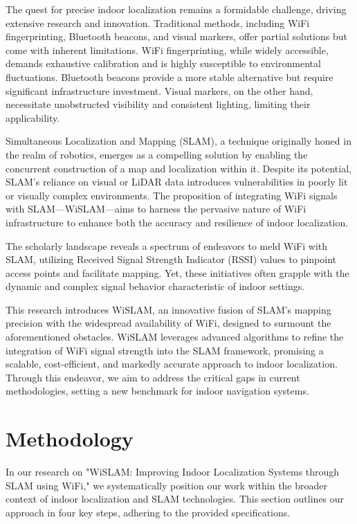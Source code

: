 \documentclass[
	a4paper, %
	11pt, %
	unnumberedsections, %
	twoside, %
]{LTJournalArticle}
\begin{document}
The quest for precise indoor localization remains a formidable challenge, driving extensive research and innovation. Traditional methods, including WiFi fingerprinting, Bluetooth beacons, and visual markers, offer partial solutions but come with inherent limitations. WiFi fingerprinting, while widely accessible, demands exhaustive calibration and is highly susceptible to environmental fluctuations. Bluetooth beacons provide a more stable alternative but require significant infrastructure investment. Visual markers, on the other hand, necessitate unobstructed visibility and consistent lighting, limiting their applicability.

Simultaneous Localization and Mapping (SLAM), a technique originally honed in the realm of robotics, emerges as a compelling solution by enabling the concurrent construction of a map and localization within it. Despite its potential, SLAM's reliance on visual or LiDAR data introduces vulnerabilities in poorly lit or visually complex environments. The proposition of integrating WiFi signals with SLAM—WiSLAM—aims to harness the pervasive nature of WiFi infrastructure to enhance both the accuracy and resilience of indoor localization.

The scholarly landscape reveals a spectrum of endeavors to meld WiFi with SLAM, utilizing Received Signal Strength Indicator (RSSI) values to pinpoint access points and facilitate mapping. Yet, these initiatives often grapple with the dynamic and complex signal behavior characteristic of indoor settings.

This research introduces WiSLAM, an innovative fusion of SLAM's mapping precision with the widespread availability of WiFi, designed to surmount the aforementioned obstacles. WiSLAM leverages advanced algorithms to refine the integration of WiFi signal strength into the SLAM framework, promising a scalable, cost-efficient, and markedly accurate approach to indoor localization. Through this endeavor, we aim to address the critical gaps in current methodologies, setting a new benchmark for indoor navigation systems.


\section{Methodology}

In our research on "WiSLAM: Improving Indoor Localization Systems through SLAM using WiFi," we systematically position our work within the broader context of indoor localization and SLAM technologies. This section outlines our approach in four key steps, adhering to the provided specifications.
\end{document}

